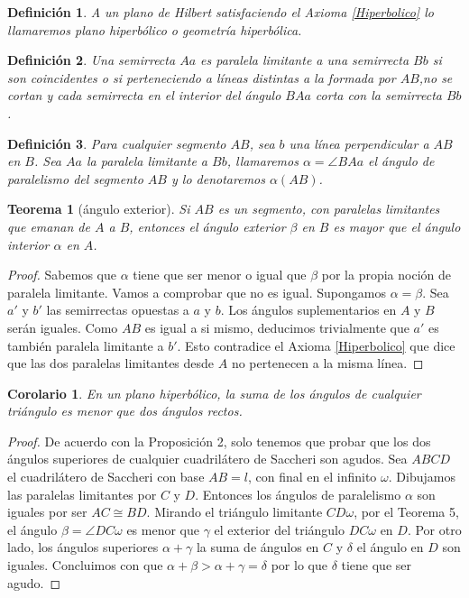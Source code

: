 \documentclass[a4paper]{amsart}
\theoremstyle{plain}
\newtheorem{theorem}{Teorema}
\newtheorem{definition}{Definición}
\newtheorem{corollary}{Corolario}
\begin{document}
\begin{definition}
A un plano de Hilbert satisfaciendo el Axioma \ref{Hiperbolico} lo llamaremos plano hiperbólico o geometría hiperbólica.
\end{definition}

\begin{definition}
Una semirrecta $Aa$ es paralela limitante a una semirrecta $Bb$ si son coincidentes o si perteneciendo a líneas distintas a la formada por $AB$,no se cortan y cada semirrecta en el interior del ángulo $BAa$ corta con la semirrecta $Bb$.
\end{definition}

\begin{definition}
Para cualquier segmento $AB$, sea $b$ una línea perpendicular a $AB$ en $B$. Sea $Aa$ la paralela limitante a $Bb$, llamaremos $\alpha=\angle BAa$ el ángulo de paralelismo del segmento $AB$ y lo denotaremos $\alpha (AB)$.
\end{definition}

\begin{theorem}[ángulo exterior]
Si $AB$ es un segmento, con paralelas limitantes que emanan de $A$ a $B$, entonces el ángulo exterior $\beta$ en $B$ es mayor que el ángulo interior $\alpha$ en $A$.
\end{theorem}

\begin{proof}
Sabemos que $\alpha$ tiene que ser menor o igual que $\beta$ por la propia noción de paralela limitante. Vamos a comprobar que no es igual.
Supongamos $\alpha=\beta$. Sea $a'$ y $b'$ las semirrectas opuestas a $a$ y $b$. Los ángulos suplementarios en $A$ y $B$ serán iguales. Como $AB$ es igual a si mismo, deducimos trivialmente que $a'$ es también paralela limitante a $b'$.
Esto contradice el Axioma \ref{Hiperbolico} que dice que las dos paralelas limitantes desde $A$ no pertenecen a la misma línea.
\end{proof}

\begin{corollary}
En un plano hiperbólico, la suma de los ángulos de cualquier triángulo es menor que dos ángulos rectos.
\end{corollary}

\begin{proof}
De acuerdo con la Proposición 2, solo tenemos que probar que los dos ángulos superiores de cualquier cuadrilátero de Saccheri son agudos.
Sea $ABCD$ el cuadrilátero de Saccheri con base $AB=l$, con final en el infinito $\omega$. Dibujamos las paralelas limitantes por $C$ y $D$. Entonces los ángulos de paralelismo $\alpha$ son iguales por ser $AC\cong BD$.
Mirando el triángulo limitante $CD\omega$, por el Teorema 5, el ángulo $\beta=\angle DC\omega $ es menor que $\gamma$ el exterior  del triángulo $DC\omega$ en $D$. Por otro lado, los ángulos superiores $\alpha + \gamma$ la suma de ángulos en $C$ y $\delta$ el ángulo en $D$ son iguales. Concluimos con que $\alpha + \beta > \alpha +\gamma =\delta$ por lo que $\delta$ tiene que ser agudo.
\end{proof}
\end{document}
